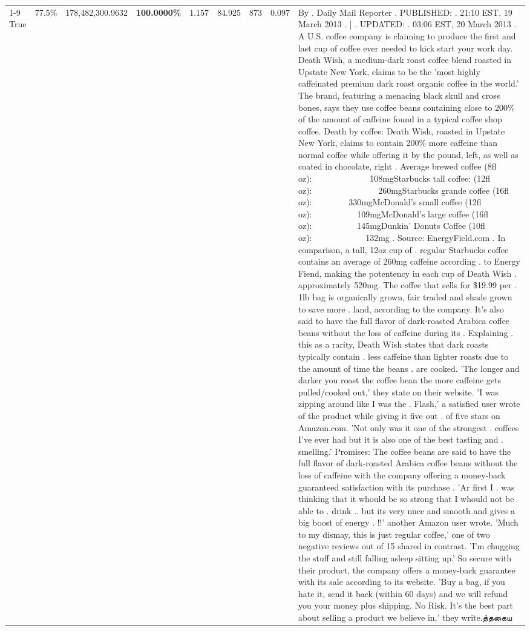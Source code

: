 \begin{table}[H]
{\begin{tabular}{lllrlllll}
\cline{1-9} \cline{2-9}
True & 77.5\% & 178,482,300.9632 & \bfseries \color{red} 100.0000\% & 1.157 & 84.925 & 873 & 0.097 & By . Daily Mail Reporter . PUBLISHED: . 21:10 EST, 19 March 2013 . | . UPDATED: . 03:06 EST, 20 March 2013 . A U.S. coffee company is claiming to produce the first and last cup of coffee ever needed to kick start your work day. Death Wish, a medium-dark roast coffee blend roasted in Upstate New York, claims to be the 'most highly caffeinated premium dark roast organic coffee in the world.' The brand, featuring a menacing black skull and cross bones, says they use coffee beans containing close to 200\% of the amount of caffeine found in a typical coffee shop coffee. Death by coffee: Death Wish, roasted in Upstate New York, claims to contain 200\% more caffeine than normal coffee while offering it by the pound, left, as well as coated in chocolate, right . Average brewed coffee (8fl oz):              108mgStarbucks tall coffee: (12fl oz):                260mgStarbucks grande coffee (16fl oz):         330mgMcDonald's small coffee (12fl oz):           109mgMcDonald's large coffee (16fl oz):           145mgDunkin' Donuts Coffee (10fl oz):             132mg . Source: EnergyField.com . In comparison, a tall, 12oz cup of . regular Starbucks coffee contains an average of 260mg caffeine according . to Energy Fiend, making the potentency in each cup of Death Wish . approximately 520mg. The coffee that sells for \$19.99 per . 1lb bag is organically grown, fair traded and shade grown to save more . land, according to the company. It's also said to have the full flavor of dark-roasted Arabica coffee beans without the loss of caffeine during its . Explaining . this as a rarity, Death Wish states that dark roasts typically contain . less caffeine than lighter roasts due to the amount of time the beans . are cooked. 'The longer and darker you roast the coffee bean the more caffeine gets pulled/cooked out,' they state on their website. 'I was zipping around like I was the . Flash,' a satisfied user wrote of the product while giving it five out . of five stars on Amazon.com. 'Not only was it one of the strongest . coffees I've ever had but it is also one of the best tasting and . smelling.’ Promises: The coffee beans are said to have the full flavor of dark-roasted Arabica coffee beans without the loss of caffeine with the company offering a money-back guaranteed satisfaction with its purchase . 'Ar first I . was thinking that it whould be so strong that I whould not be able to . drink .. but its very nuce and smooth and gives a big boost of energy . !!' another Amazon user wrote. 'Much to my dismay, this is just regular coffee,' one of two negative reviews out of 15 shared in contrast. 'I'm chugging the stuff and still falling asleep sitting up.' So secure with their product, the company offers a money-back guarantee with its sale according to its website. 'Buy a bag, if you hate it, send it back (within 60 days) and we will refund you your money plus shipping. No Risk. It’s the best part about selling a product we believe in,' they write.த்தகைய \\

\end{tabular}}
\end{table}
